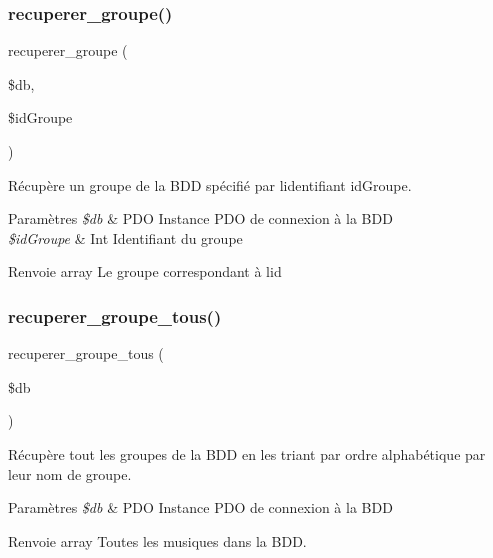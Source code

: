 \subsubsection{\texorpdfstring{recuperer\+\_\+groupe()}{recuperer\_groupe()}}
{\footnotesize\ttfamily recuperer\+\_\+groupe (\begin{DoxyParamCaption}\item[{}]{\$db,  }\item[{}]{\$id\+Groupe }\end{DoxyParamCaption})}



Récupère un groupe de la B\+DD spécifié par l\textquotesingle{}identifiant \textquotesingle{}id\+Groupe\textquotesingle{}. 


\begin{DoxyParams}{Paramètres}
{\em \$db} & P\+DO Instance P\+DO de connexion à la B\+DD \\
\hline
{\em \$id\+Groupe} & Int Identifiant du groupe \\
\hline
\end{DoxyParams}
\begin{DoxyReturn}{Renvoie}
array Le groupe correspondant à l\textquotesingle{}id 
\end{DoxyReturn}
\mbox{\label{fonctionGroupe_8php_ab838f956b9b2a941a1612ad8a681bf51}} 
\subsubsection{\texorpdfstring{recuperer\+\_\+groupe\+\_\+tous()}{recuperer\_groupe\_tous()}}
{\footnotesize\ttfamily recuperer\+\_\+groupe\+\_\+tous (\begin{DoxyParamCaption}\item[{}]{\$db }\end{DoxyParamCaption})}



Récupère tout les groupes de la B\+DD en les triant par ordre alphabétique par leur nom de groupe. 


\begin{DoxyParams}{Paramètres}
{\em \$db} & P\+DO Instance P\+DO de connexion à la B\+DD \\
\hline
\end{DoxyParams}
\begin{DoxyReturn}{Renvoie}
array Toutes les musiques dans la B\+DD. 
\end{DoxyReturn}
\mbox{\label{fonctionGroupe_8php_ac8697575153e35f57430871856fb20c0}} 
